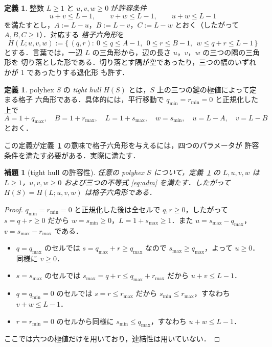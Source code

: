 \documentclass[11pt]{article}
\theoremstyle{plain}
\newtheorem{lemma}[theorem]{補題}
\theoremstyle{definition}
\newtheorem{definition}[theorem]{定義}
\theoremstyle{remark}
\begin{document}
\begin{definition}\label{def:hexagon}
整数 \(L\ge1\) と \(u,v,w\ge0\) が\emph{許容条件}
\begin{equation}\label{eq:adm}
   u+v\le L-1,\qquad v+w\le L-1,\qquad u+w\le L-1
\end{equation}
を満たすとし，\(A:=L-u\)，\(B:=L-v\)，\(C:=L-w\) とおく（したがって \(A,B,C\ge1\)）．対応する
\emph{格子六角形}を
\[
   H(L;u,v,w):=\{\,(q,r):\ 0\le q\le A-1,\ \ 0\le r\le B-1,\ \ w\le q+r\le L-1\,\}
\]
とする．言葉では，一辺 \(L\) の三角形から，辺の長さ \(u\)，\(v\)，\(w\) の三つの隅の三角形を
切り落とした形である．切り落とす隅が空であったり，三つの幅のいずれかが 1 であったりする退化形
も許す．
\end{definition}

\begin{definition}\label{def:hull}
polyhex \(S\) の \emph{tight hull} \(H(S)\) とは，\(S\) 上の三つの鍵の極値によって定まる格子
六角形である．具体的には，平行移動で \(q_{\min}=r_{\min}=0\) と正規化した上で
\[
   A=1+q_{\max},\quad B=1+r_{\max},\quad L=1+s_{\max},\quad w=s_{\min},\quad
   u=L-A,\quad v=L-B
\]
とおく．
\end{definition}

この定義が定義~\ref{def:hexagon} の意味で格子六角形を与えるには，四つのパラメータが
許容条件を満たす必要がある．実際に満たす．

\begin{lemma}[tight hull の許容性]\label{lem:tightadm}
任意の polyhex \(S\) について，定義~\ref{def:hull} の \(L,u,v,w\) は
\(L\ge1\)，\(u,v,w\ge0\) および三つの不等式 \eqref{eq:adm} を満たす．したがって
\(H(S)=H(L;u,v,w)\) は格子六角形である．
\end{lemma}

\begin{proof}
\(q_{\min}=r_{\min}=0\) と正規化した後は全セルで \(q,r\ge0\)，したがって
\(s=q+r\ge0\) だから \(w=s_{\min}\ge0\)，\(L=1+s_{\max}\ge1\)．また
\(u=s_{\max}-q_{\max}\)，\(v=s_{\max}-r_{\max}\) である．
\begin{itemize}
\item \(q=q_{\max}\) のセルでは \(s=q_{\max}+r\ge q_{\max}\) なので
\(s_{\max}\ge q_{\max}\)，よって \(u\ge0\)．同様に \(v\ge0\)．
\item \(s=s_{\max}\) のセルでは \(s_{\max}=q+r\le q_{\max}+r_{\max}\) だから
\(u+v\le L-1\)．
\item \(q=q_{\min}=0\) のセルでは \(s=r\le r_{\max}\) だから
\(s_{\min}\le r_{\max}\)，すなわち \(v+w\le L-1\)．
\item \(r=r_{\min}=0\) のセルから同様に \(s_{\min}\le q_{\max}\)，すなわち
\(u+w\le L-1\)．
\end{itemize}
ここでは六つの極値だけを用いており，連結性は用いていない．
\end{proof}
\end{document}
